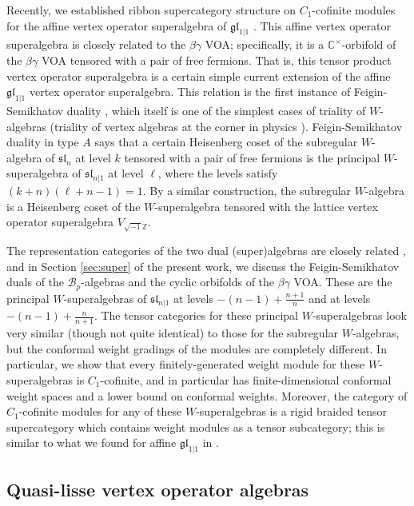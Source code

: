 \documentclass[11pt, reqno]{amsart}
\theoremstyle{definition}\newtheorem{defi}[thm]{Definition}
\theoremstyle{definition}\newtheorem{rem}[thm]{Remark}
\theoremstyle{definition}\newtheorem{exam}[thm]{Example}
\theoremstyle{definition}\newtheorem{assum}[thm]{Assumption}
\newcommand{\cB}{\mathcal{B}}
\newcommand{\ZZ}{\mathbb{Z}}
\begin{document}
 Recently, we established ribbon supercategory structure on $C_1$-cofinite modules for the affine vertex operator superalgebra of $\mathfrak{gl}_{1|1}$ \cite{CMY3}. This affine vertex operator superalgebra is closely related to the $\beta\gamma$ VOA; specifically, it is a $\mathbb C^\times$-orbifold of the $\beta\gamma$ VOA tensored with a pair of free fermions. That is, this tensor product vertex operator superalgebra is a certain simple current extension of the affine $\mathfrak{gl}_{1\vert 1}$ vertex operator superalgebra. This relation is the first instance of Feigin-Semikhatov duality \cite{FS, CGN}, which itself is one of the simplest cases of triality of $W$-algebras  \cite{CL-trialities, CL-ortho} (triality of vertex algebras at the corner in physics \cite{GR}). Feigin-Semikhatov duality in type $A$ says that a certain Heisenberg coset of the subregular $W$-algebra of $\mathfrak{sl}_n$ at level $k$ tensored with a pair of free fermions is the principal $W$-superalgebra of $\mathfrak{sl}_{n|1}$ at level $\ell$, where the levels satisfy $(k+n)(\ell+n-1) =1$. By a similar construction, the subregular $W$-algebra is a Heisenberg coset of the $W$-superalgebra tensored with the lattice vertex operator superalgebra $V_{\sqrt{-1}\ZZ}$. 
 
 The representation categories of the two dual (super)algebras are closely related \cite{CGNS}, and in Section \ref{sec:super} of the present work, we discuss the Feigin-Semikhatov duals of the $\cB_p$-algebras and the cyclic orbifolds of the $\beta\gamma$ VOA. These are the principal $W$-superalgebras of $\mathfrak{sl}_{n|1}$ at levels $- (n -1) + \frac{n+1}{n}$ and at levels $- (n -1) + \frac{n}{n+1}$. The tensor categories for these principal $W$-superalgebras look very similar (though not quite identical) to those for the subregular $W$-algebras, but the conformal weight gradings of the modules are completely different. In particular, we show that every finitely-generated weight module for these $W$-superalgebras is $C_1$-cofinite, and in particular has finite-dimensional conformal weight spaces and a lower bound on conformal weights. Moreover, the category of $C_1$-cofinite modules for any of these $W$-superalgebras is a rigid braided tensor supercategory which contains weight modules as a tensor subcategory; this is similar to what we found for affine $\mathfrak{gl}_{1\vert 1}$ in \cite{CMY3}.


\subsection{Quasi-lisse vertex operator algebras}
\end{document}
